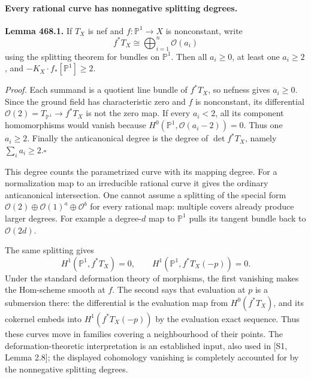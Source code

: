 \documentclass[11pt]{article}
\begin{document}
\paragraph{Every rational curve has nonnegative splitting degrees.}
\textbf{Lemma 468.1.} If $T_X$ is nef and
$f:\mathbb P^1\to X$ is nonconstant, write
\[
 f^*T_X\cong\bigoplus_{i=1}^n\mathcal O(a_i)
\]
using the splitting theorem for bundles on $\mathbb P^1$. Then all
$a_i\geq0$, at least one $a_i\geq2$, and
$-K_X\cdot f_*[\mathbb P^1]\geq2$.

\emph{Proof.}
Each summand is a quotient line bundle of $f^*T_X$, so nefness gives
$a_i\geq0$. Since the ground field has characteristic zero and $f$
is nonconstant, its differential
$\mathcal O(2)=T_{\mathbb P^1}\to f^*T_X$ is not the zero map.
If every $a_i<2$, all its component homomorphisms would vanish because
$H^0(\mathbb P^1,\mathcal O(a_i-2))=0$. Thus one $a_i\geq2$.
Finally the anticanonical degree is the degree of $\det f^*T_X$,
namely $\sum_i a_i\geq2$.\hfill$\square$

This degree counts the parametrized curve with its mapping degree.
For a normalization map to an irreducible rational curve it gives the
ordinary anticanonical intersection. One cannot assume a splitting
of the special form $\mathcal O(2)\oplus\mathcal O(1)^a\oplus\mathcal O^b$
for every rational map: multiple covers already produce larger degrees.
For example a degree-$d$ map to $\mathbb P^1$ pulls its tangent bundle
back to $\mathcal O(2d)$.

The same splitting gives
\[
 H^1(\mathbb P^1,f^*T_X)=0,
 \qquad H^1(\mathbb P^1,f^*T_X(-p))=0.
\]
Under the standard deformation theory of morphisms, the first vanishing
makes the Hom-scheme smooth at $f$. The second says that evaluation
at $p$ is a submersion there: the differential is the evaluation map
from $H^0(f^*T_X)$, and its cokernel embeds into
$H^1(f^*T_X(-p))$ by the evaluation exact sequence.
Thus these curves move in families covering a neighbourhood of their
points. The deformation-theoretic interpretation is an established
input, also used in [S1, Lemma 2.8]; the displayed cohomology vanishing
is completely accounted for by the nonnegative splitting degrees.
\end{document}
